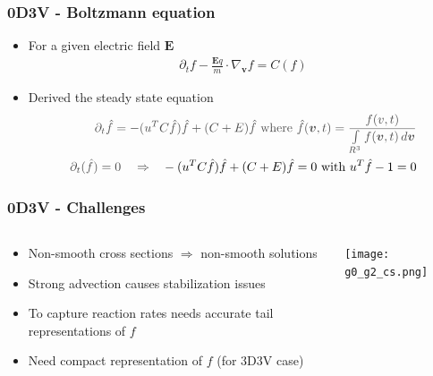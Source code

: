 \documentclass[mathserif, aspectratio=169]{beamer}
\newcommand{\vect}[1]{\boldsymbol{#1}}
\newcommand{\myint}{\int\limits}
\newcommand{\diff}[1]{\, d#1}
\begin{document}
\begin{frame}
	\frametitle{0D3V - Boltzmann equation}
	\begin{itemize}
		\item For a given electric field $\vect{E}$
		\begin{align}
			\partial_t f -\frac{\vect{E} q}{m} \cdot \nabla_{\vect{v }}f = C(f)
		\end{align} 
		\item Derived the steady state equation
		\begin{align}
			\textcolor{black!70}{\partial_t \hat{f} = -(u^T C \hat{f}) \hat{f} + (C+E)\hat{f} \text{ where } \hat{f}(\vect{v},t) = \frac{f(v,t)}{\myint_{R^3} f(\vect{v},t) \diff{\vect{v}}}}\\
			\textcolor{black!70}{\partial_t (\hat{f}) = 0 \ \ \  \Rightarrow} \ \ \  -(u^T C \hat{f}) \hat{f} + (C+E)\hat{f} =0  \text{ with } u^T \hat{f}-1=0
		\end{align}
	\end{itemize}
\end{frame}

\begin{frame}
	\frametitle{0D3V - Challenges}
	\begin{columns}
		\begin{column}{0.45\textwidth}
			\begin{itemize}
				\item Non-smooth cross sections $\Rightarrow$ non-smooth solutions
				\item Strong advection causes stabilization issues
				\item To capture reaction rates needs accurate tail representations of $f$
				\item Need compact representation of $f$ (for 3D3V case)
			\end{itemize}
		\end{column}
		\begin{column}{0.45\textwidth}
			\begin{center}
				\texttt{[image: g0\_g2\_cs.png]}
			\end{center}
		\end{column}
	\end{columns}
\end{frame}
\end{document}

